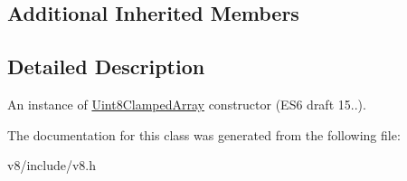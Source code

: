 \subsection*{Additional Inherited Members}


\subsection{Detailed Description}
An instance of \mbox{\hyperlink{classv8_1_1Uint8ClampedArray}{Uint8\+Clamped\+Array}} constructor (E\+S6 draft 15..). 

The documentation for this class was generated from the following file\+:\begin{DoxyCompactItemize}
\item 
v8/include/v8.\+h\end{DoxyCompactItemize}
